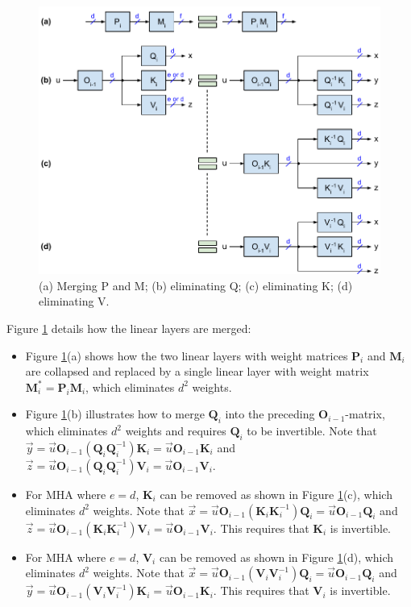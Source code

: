 \documentclass{article}
\newcommand{\mat}[1]{\mathbf{#1}}  %
\def\Q{\mat{Q}_i}
\def\K{\mat{K}_i}
\def\V{\mat{V}_i}
\def\P{\mat{P}_i}
\def\O{\mat{O}_{i-1}}
\def\M{\mat{M}_i}
\def\u{\vec{u}}
\def\x{\vec{x}}
\def\y{\vec{y}}
\def\z{\vec{z}}
\begin{document}
\begin{figure}[h!] \centering %
  \includegraphics[scale=0.92]{figs/remove_fig2.pdf}
  \caption{(a) Merging P and M; (b) eliminating Q; (c) eliminating K; (d) eliminating V.}
\label{fig2} \end{figure}

Figure \ref{fig2} details how the linear layers are merged:
\begin{itemize}[topsep=-1pt, itemsep=-1pt]
  \item Figure \ref{fig2}(a) shows how the two linear layers with weight matrices $\P$ and $\M$ are collapsed and replaced by a single linear layer with weight matrix $\M^* = \P \M$, which eliminates $d^2$ weights.
  \item Figure \ref{fig2}(b) illustrates how to merge $\Q$ into the preceding $\O$-matrix, which eliminates $d^2$ weights and requires $\Q$ to be invertible. Note that $\y = \u \O (\Q \Q^{-1}) \K = \u \O \K$ and $\z = \u \O (\Q \Q^{-1}) \V = \u \O \V$.
  \item For MHA where $e = d$, $\K$ can be removed as shown in Figure \ref{fig2}(c), which eliminates $d^2$ weights. Note that $\x = \u \O (\K \K^{-1}) \Q = \u \O \Q$ and $\z = \u \O (\K \K^{-1}) \V = \u \O \V$. This requires that $\K$ is invertible.
  \item For MHA where $e = d$, $\V$ can be removed as shown in Figure \ref{fig2}(d), which eliminates $d^2$ weights. Note that $\x = \u \O (\V \V^{-1}) \Q = \u \O \Q$ and $\y = \u \O (\V \V^{-1}) \K = \u \O \K$. This requires that $\V$ is invertible.
\end{itemize}
\end{document}
